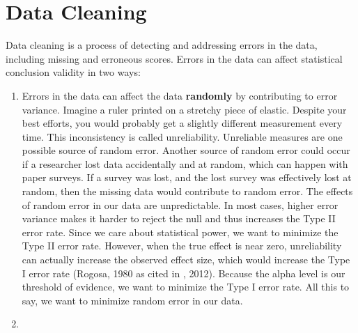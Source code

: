 \documentclass[
]{book}
\begin{document}
\hypertarget{data-cleaning}{%
\section{Data Cleaning}\label{data-cleaning}}

Data cleaning is a process of detecting and addressing errors in the data, including missing and erroneous scores. Errors in the data can affect statistical conclusion validity in two ways:

\begin{enumerate}
\def\labelenumi{\arabic{enumi}.}
\item
  Errors in the data can affect the data \textbf{randomly} by contributing to error variance. Imagine a ruler printed on a stretchy piece of elastic. Despite your best efforts, you would probably get a slightly different measurement every time. This inconsistency is called unreliability. Unreliable measures are one possible source of random error. Another source of random error could occur if a researcher lost data accidentally and at random, which can happen with paper surveys. If a survey was lost, and the lost survey was effectively lost at random, then the missing data would contribute to random error. The effects of random error in our data are unpredictable. In most cases, higher error variance makes it harder to reject the null and thus increases the Type II error rate. Since we care about statistical power, we want to minimize the Type II error rate. However, when the true effect is near zero, unreliability can actually increase the observed effect size, which would increase the Type I error rate (Rogosa, 1980 as cited in \citet{Shadish2002}, 2012). Because the alpha level is our threshold of evidence, we want to minimize the Type I error rate. All this to say, we want to minimize random error in our data.
\item

\end{enumerate}
\end{document}
